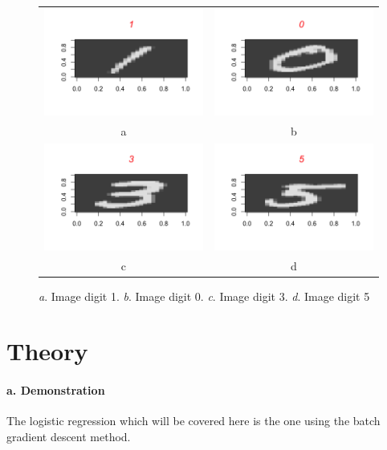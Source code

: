 \documentclass[a4paper,11pt]{article}
\begin{document}
\begin{figure}[!ht]
\centering
\begin{tabular}{cc}
	\includegraphics[width=.3\textwidth]{image_1}&
	\includegraphics[width=.3\textwidth]{image_0}\\
	a&b\\
	\includegraphics[width=.3\textwidth]{image_3}&
	\includegraphics[width=.3\textwidth]{image_5}\\
	c&d\\
\end{tabular}
\caption{\textit{a}. Image digit 1. \textit{b}. Image digit 0. \textit{c}. Image digit 3. \textit{d}. Image digit 5}
\label{images}
\end{figure}

\section{Theory}

\paragraph*{a. Demonstration}

The logistic regression which will be covered here is the one using the batch gradient descent method.
\end{document}

